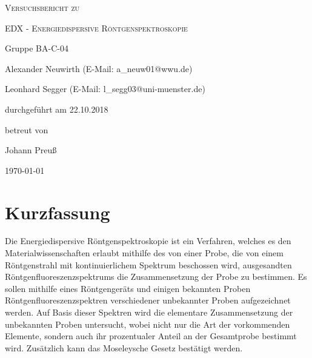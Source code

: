\documentclass[
	a4paper,
	12pt,
	pagesize,
	ngerman
]{scrartcl}
\begin{document}
	
	\begin{titlepage}
		\centering
		{\scshape\LARGE Versuchsbericht zu \par}
		\vspace{1cm}
		{\scshape\huge EDX - Energiedispersive Röntgenspektroskopie \par}
		\vspace{2.5cm}
		{\LARGE Gruppe BA-C-04 \par}
		\vspace{0.5cm}
		
		{\large Alexander Neuwirth (E-Mail: a\_neuw01@wwu.de) \par}
		{\large Leonhard Segger (E-Mail: l\_segg03@uni-muenster.de) \par}
		\vfill
		
		durchgeführt am 22.10.2018\par
		betreut von\par
		{\large Johann Preuß} %
		
		\vfill
		
		{\large \today\par}
	\end{titlepage}
	\tableofcontents
	\newpage


	\section{Kurzfassung}
	Die Energiedispersive Röntgenspektroskopie ist ein Verfahren, welches es den Materialwissenschaften erlaubt mithilfe des von einer Probe, die von einem Röntgenstrahl mit kontinuierlichem Spektrum beschossen wird, ausgesandten Röntgenfluoreszenzspektrums die Zusammensetzung der Probe zu bestimmen.
	Es sollen mithilfe eines Röntgengeräts und einigen bekannten Proben Röntgenfluoreszenzspektren verschiedener unbekannter Proben aufgezeichnet werden.%
	Auf Basis dieser Spektren wird die elementare Zusammensetzung der unbekannten Proben untersucht, wobei nicht nur die Art der vorkommenden Elemente, sondern auch ihr prozentualer Anteil an der Gesamtprobe bestimmt wird. %
	Zusätzlich kann das Moseleysche Gesetz bestätigt werden. %
	
\end{document}
